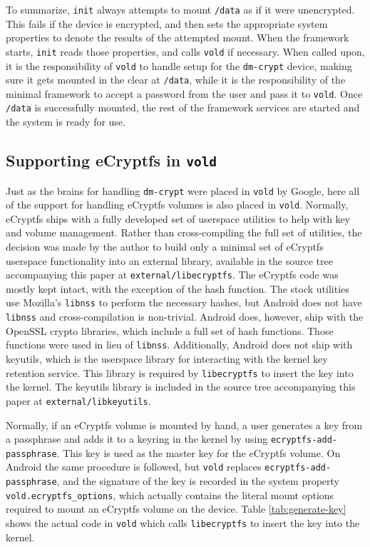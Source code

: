 To summarize, \texttt{init} always attempts to mount \texttt{/data} as if it were unencrypted. This fails if the device is
encrypted, and then sets the appropriate system properties to denote the results of the attempted mount. When the framework starts,
\texttt{init} reads those properties, and calls \texttt{vold} if necessary. When called upon, it is the responsibility of
\texttt{vold} to handle setup for the \texttt{dm-crypt} device, making sure it gets mounted in the clear at \texttt{/data}, while it
is the responsibility of the minimal framework to accept a password from the user and pass it to \texttt{vold}. Once \texttt{/data}
is successfully mounted, the rest of the framework services are started and the system is ready for use.

\subsection{Supporting eCryptfs in \texttt{vold}} \label{sec:ecryptfsvold} Just as the brains for handling \texttt{dm-crypt} were
placed in \texttt{vold} by Google, here all of the support for handling eCryptfs volumes is also placed in \texttt{vold}. Normally,
eCryptfs ships with a fully developed set of userspace utilities to help with key and volume management. Rather than cross-compiling
the full set of utilities, the decision was made by the author to build only a minimal set of eCryptfs userspace functionality into
an external library, available in the source tree accompanying this paper at \texttt{external/libecryptfs}.  The eCryptfs code was
mostly kept intact, with the exception of the hash function. The stock utilities use Mozilla's \texttt{libnss} to perform the
necessary hashes, but Android does not have \texttt{libnss} and cross-compilation is non-trivial. Android does, however, ship with
the OpenSSL crypto libraries, which include a full set of hash functions. Those functions were used in lieu of \texttt{libnss}.
Additionally, Android does not ship with keyutils, which is the userspace library for interacting with the kernel key retention
service.  This library is required by \texttt{libecryptfs} to insert the key into the kernel. The keyutils library is included in
the source tree accompanying this paper at \texttt{external/libkeyutils}. 

Normally, if an eCryptfs volume is mounted by hand, a user generates a key from a passphrase and adds it to a keyring in the kernel
by using \texttt{ecryptfs-add-passphrase}.  This key is used as the master key for the eCryptfs volume. On Android the same
procedure is followed, but \texttt{vold} replaces \texttt{ecryptfs-add-passphrase}, and the signature of the key is recorded in the
system property \texttt{vold.ecryptfs\_options}, which actually contains the literal mount options required to mount an eCryptfs
volume on the device. Table \ref{tab:generate-key} shows the actual code in \texttt{vold} which calls \texttt{libecryptfs} to insert
the key into the kernel. 

